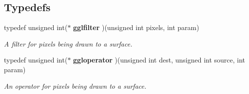 \subsection*{Typedefs}
\begin{CompactItemize}
\item 
typedef unsigned int($\ast$ {\bf gglfilter} )(unsigned int pixels, int param)
\begin{CompactList}\small\item\em A filter for pixels being drawn to a surface. \item\end{CompactList}\item 
typedef unsigned int($\ast$ {\bf ggloperator} )(unsigned int dest, unsigned int source, int param)
\begin{CompactList}\small\item\em An operator for pixels being drawn to a surface. \item\end{CompactList}\end{CompactItemize}
